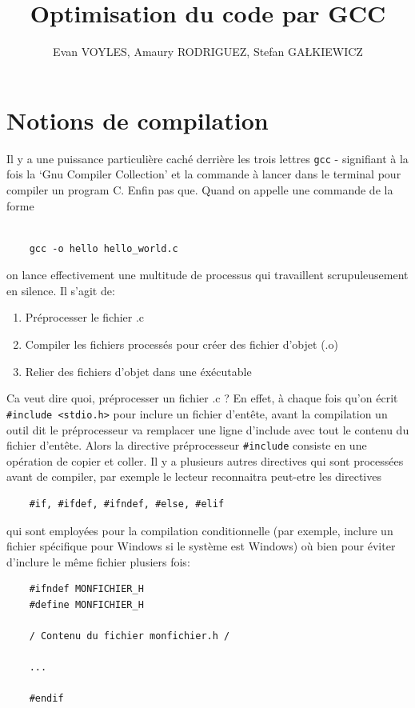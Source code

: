 \documentclass[11pt]{article} %
\title{Optimisation du code par GCC}
\author{Evan VOYLES, Amaury RODRIGUEZ, Stefan GA\L KIEWICZ}
\begin{document}
\maketitle

\section*{Notions de compilation}
Il y a une puissance particuli\`ere caché derrière les trois lettres \verb|gcc| - signifiant à la fois
la `Gnu Compiler Collection' et la commande à lancer dans le terminal pour compiler un program C. Enfin pas que.
Quand on appelle une commande de la forme
\begin{verbatim}

    gcc -o hello hello_world.c
\end{verbatim}
on lance effectivement une multitude de processus qui travaillent scrupuleusement en silence.
Il s'agit de:
\begin{enumerate}
    \item Préprocesser le fichier .c
    \item Compiler les fichiers processés pour créer des fichier d'objet (.o)
    \item Relier des fichiers d'objet dans une éxécutable
\end{enumerate}

Ca veut dire quoi, préprocesser un fichier .c ? En effet, à chaque fois qu'on
écrit \verb|#include <stdio.h>| pour inclure un fichier d'entête, avant la compilation
un outil dit le préprocesseur va remplacer une ligne d'include avec tout le contenu du fichier d'entête.
Alors la directive préprocesseur \verb|#include| consiste en une opération de copier et coller. Il y a plusieurs autres directives qui sont processées avant de compiler,
par exemple le lecteur reconnaitra peut-etre les directives
\begin{verbatim}
    #if, #ifdef, #ifndef, #else, #elif
\end{verbatim}
qui sont employées
pour la compilation conditionnelle (par exemple, inclure un fichier spécifique pour Windows si le système est Windows)
où bien pour éviter d'inclure le même fichier plusiers fois:
\begin{verbatim}
    #ifndef MONFICHIER_H
    #define MONFICHIER_H

    / Contenu du fichier monfichier.h /

    ...

    #endif
\end{verbatim}
\end{document}
